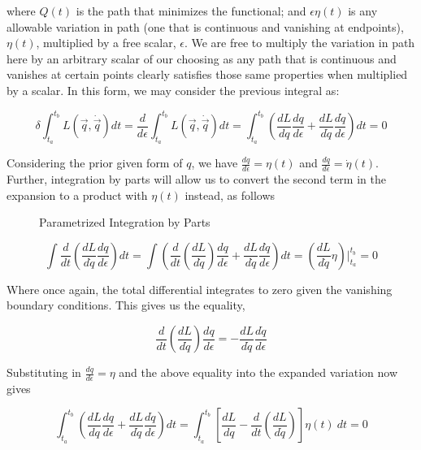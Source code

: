 \documentclass{article}\usepackage[]{graphicx}\usepackage[]{color}
\begin{document}
where $Q(t)$ is the path that minimizes the functional; and $\epsilon\eta(t)$ is any allowable variation in path (one that is continuous and vanishing at endpoints),$\eta(t)$, multiplied by a free scalar, $\epsilon$. We are free to multiply the variation in path here by an arbitrary scalar of our choosing as any path that is continuous and vanishes at certain points clearly satisfies those same properties when multiplied by a scalar. In this form, we may consider the previous integral as:

\begin{equation}
\delta\int^{t_b}_{t_a}L(\vec{q},\dot{\vec{q}})dt=\frac{d}{d\epsilon}\int^{t_b}_{t_a}L(\vec{q},\dot{\vec{q}})dt=\int^{t_b}_{t_a}\left( \frac{dL}{dq}\frac{dq}{d\epsilon}+\frac{dL}{d\dot{q}}\frac{d\dot{q}}{d\epsilon}\right) dt=0
\end{equation}

Considering the prior given form of $q$, we have $\frac{dq}{d\epsilon}=\eta(t)$ and $\frac{d\dot{q}}{d\epsilon}=\dot{\eta}(t)$. Further, integration by parts will allow us to convert the second term in the expansion to a product with $\eta(t)$ instead, as follows

   \begin{figure}\centering
    
 \vspace{-1cm}
\caption{Parametrized Integration by Parts}
	\end{figure}
	
$$\int\frac{d}{dt}\left( \frac{dL}{d\dot{q}}\frac{dq}{d\epsilon} \right) dt
=\int\left(\frac{d}{dt}\left(\frac{dL}{d\dot{q}}\right)\frac{dq}{d\epsilon}+\frac{dL}{d\dot{q}}\frac{d\dot{q}}{d\epsilon}\right)dt=\left( \frac{dL}{d\dot{q}}\eta \right) \vert^{t_b}_{t_a}=0
$$
 
Where once again, the total differential integrates to zero given the vanishing boundary conditions. This gives us the equality,

$$
\frac{d}{dt}\left(\frac{dL}{d\dot{q}}\right)\frac{dq}{d\epsilon}=-\frac{dL}{d\dot{q}}\frac{d\dot{q}}{d\epsilon}
$$

Substituting in $\frac{dq}{d\epsilon}=\eta$ and the above equality into the expanded variation now gives

\begin{equation}
\int^{t_b}_{t_a}\left( \frac{dL}{dq}\frac{dq}{d\epsilon}+\frac{dL}{d\dot{q}}\frac{d\dot{q}}{d\epsilon}\right) dt=\int^{t_b}_{t_a}\left[ \frac{dL}{dq} -\frac{d}{dt}\left( \frac{dL}{d\dot{q}}\right)  \right] \eta(t) \ dt=0
\end{equation}
\end{document}
